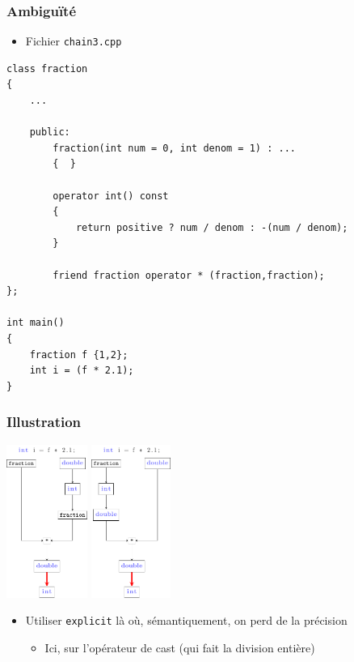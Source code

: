 \begin{frame}[containsverbatim]
\frametitle{Ambiguïté}
\begin{itemize}
\item Fichier \texttt{chain3.cpp}
\end{itemize}
\begin{lstlisting}
class fraction 
{
	...
	
	public:
		fraction(int num = 0, int denom = 1) : ...
		{  }				

		operator int() const
		{
			return positive ? num / denom : -(num / denom);
		}
    
		friend fraction operator * (fraction,fraction); 
};

int main()
{
	fraction f {1,2};  	    
	int i = (f * 2.1);
}
\end{lstlisting}
\end{frame}

\begin{frame}
\frametitle{Illustration}
\begin{center}
\includegraphics[height=5cm]{pics/conv-4.pdf}
\hspace{2cm}
\includegraphics[height=5cm]{pics/conv-3.pdf}
\end{center}
\begin{itemize}
\item Utiliser \lstinline|explicit| là où, sémantiquement, on perd de la précision
	\begin{itemize}
	\item Ici, sur l'opérateur de cast (qui fait la division entière)
	\end{itemize}
\end{itemize}
\end{frame}

